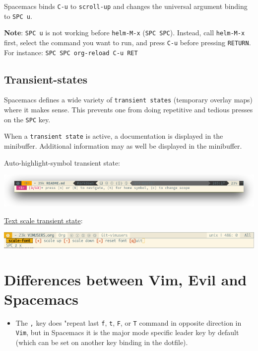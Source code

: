 \documentclass[11pt]{article}
\begin{document}
Spacemacs binds \texttt{C-u} to \texttt{scroll-up} and changes the universal argument binding
to \texttt{SPC u}.

\textbf{Note}: \texttt{SPC u} is not working before \texttt{helm-M-x} (\texttt{SPC SPC}). Instead, call
\texttt{helm-M-x} first, select the command you want to run, and press \texttt{C-u} before
pressing \texttt{RETURN}. For instance: \texttt{SPC SPC org-reload C-u RET}

\subsection{Transient-states}
\label{sec:orgb0bb9d9}
Spacemacs defines a wide variety of \texttt{transient states} (temporary overlay maps)
where it makes sense. This prevents one from doing repetitive and tedious
presses on the \texttt{SPC} key.

When a \texttt{transient state} is active, a documentation is displayed in the
minibuffer. Additional information may as well be displayed in the minibuffer.

Auto-highlight-symbol transient state:
\begin{center}
\includegraphics[width=.9\linewidth]{img/spacemacs-ahs-transient-state.png}
\end{center}
\hyperref[sec:orgae9b8c9]{Text scale transient state}:

\begin{center}
\includegraphics[width=.9\linewidth]{img/spacemacs-scale-transient-state.png}
\end{center}

\section{Differences between Vim, Evil and Spacemacs}
\label{sec:org60d05fe}
\begin{itemize}
\item The \texttt{​,​} key does "repeat last \texttt{f}, \texttt{t}, \texttt{F}, or \texttt{T} command in
opposite direction in \texttt{Vim}, but in Spacemacs it is the major mode specific
leader key by default (which can be set on another key binding in the
dotfile).
\end{itemize}
\end{document}
